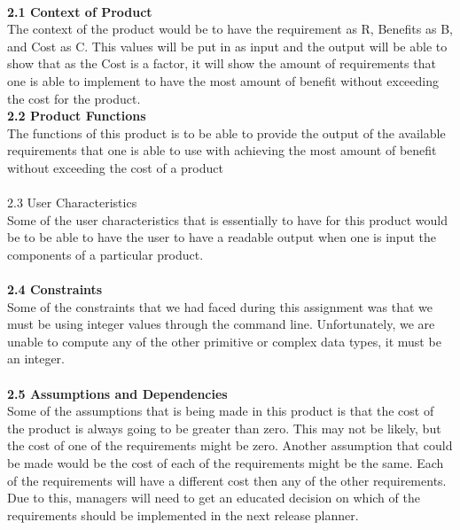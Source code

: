 \documentclass{article}
\begin{document}
\noindent
\\
\textbf{\hspace{4ex} 2.1 Context of Product}
\\
The context of the product would be to have the requirement as R, Benefits as B, and Cost as C. This values will be put in as input and the output will be able to show that as the Cost is a factor, it will show the amount of requirements that one is able to implement to have the most amount of benefit without exceeding the cost for the product.
\\
\textbf{\hspace{4ex} 2.2 Product Functions}
\\
The functions of this product is to be able to provide the output of the available requirements that one is able to use with achieving the most amount of benefit without exceeding the cost of a product
\\
\\
\noindent  
\hspace{4ex} 2.3 User Characteristics
\\
Some of the user characteristics that is essentially to have for this product would be to be able to have the user to have a readable output when one is input the components of a particular product.
\\
\\
\noindent
\textbf{\hspace{4ex} 2.4  Constraints}
\\
Some of the constraints that we had faced during this assignment was that we must be using integer values through the command line. Unfortunately, we are unable to compute any of the other primitive or complex data types, it must be an integer. 
\\
\\
\noindent
\textbf{\hspace{4ex} 2.5 Assumptions and Dependencies}
\noindent
\\
Some of the assumptions that is being made in this product is that the cost of the product is always going to be greater than zero. This may not be likely, but the cost of one of the requirements might be zero. Another assumption that could be made would be the cost of each of the requirements might be the same. Each of the requirements will have a different cost then any of the other requirements. Due to this, managers will need to get an educated decision on which of the requirements should be implemented in the next release planner.  
\\
\end{document}
